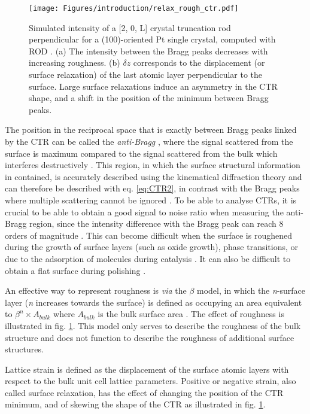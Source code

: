 \begin{figure}[!htb]
    \centering
    \texttt{[image: Figures/introduction/relax\_rough\_ctr.pdf]}
    \caption{
    Simulated intensity of a [2, 0, L] crystal truncation rod perpendicular for a (100)-oriented Pt single crystal, computed with ROD \parencite{Vlieg2000}.
    (a) The intensity between the Bragg peaks decreases with increasing roughness.
    (b) $\delta z$ corresponds to the displacement (or surface relaxation) of the last atomic layer perpendicular to the surface.
    Large surface relaxations induce an asymmetry in the CTR shape, and a shift in the position of the minimum between Bragg peaks.
    }
    \label{fig:CTRSimulation}
\end{figure}

The position in the reciprocal space that is exactly between Bragg peaks linked by the CTR can be called the \textit{anti-Bragg} \parencite{Robinson1991}, where the signal scattered from the surface is maximum compared to the signal scattered from the bulk which interferes destructively \parencite{Willmott}.
This region, in which the surface structural information in contained, is accurately described using the kinematical diffraction theory and can therefore be described with eq. \ref{eq:CTR2}, in contrast with the Bragg peaks where multiple scattering cannot be ignored \parencite{Kaganer2007}.
To be able to analyse CTRs, it is crucial to be able to obtain a good signal to noise ratio when measuring the anti-Bragg region, since the intensity difference with the Bragg peak can reach 8 orders of magnitude \parencite{Fadenberger2010}.
This can become difficult when the surface is roughened during the growth of surface layers (such as oxide growth), phase transitions, or due to the adsorption of molecules during catalysis \parencite{Zhdanov1997, Zhdanov1998}.
It can also be difficult to obtain a flat surface during polishing \parencite{Musket1982}.

An effective way to represent roughness is \textit{via} the $\beta$ model, in which the \textit{n}-surface layer (\textit{n} increases towards the surface) is defined as occupying an area equivalent to $\beta^n \times A_{bulk}$ where $A_{bulk}$ is the bulk surface area \parencite{Robinson1986}.
The effect of roughness is illustrated in fig. \ref{fig:CTRSimulation}.
This model only serves to describe the roughness of the bulk structure and does not function to describe the roughness of additional surface structures.

Lattice strain is defined as the displacement of the surface atomic layers with respect to the bulk unit cell lattice parameters.
Positive or negative strain, also called surface relaxation,
has the effect of changing the position of the CTR minimum, and of skewing the shape of the CTR as illustrated in fig. \ref{fig:CTRSimulation}.


